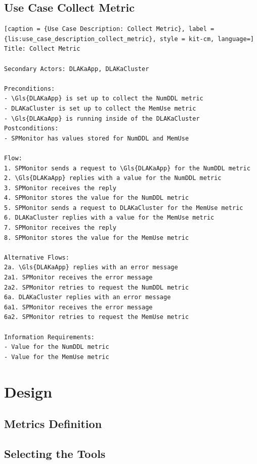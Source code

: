 \subsection{Use Case Collect Metric}

\begin{lstlisting}[caption = {Use Case Description: Collect Metric}, label = {lis:use_case_description_collect_metric}, style = kit-cm, language=]
Title: Collect Metric

Secondary Actors: DLAKaApp, DLAKaCluster

Preconditions:
- \Gls{DLAKaApp} is set up to collect the NumDDL metric
- DLAKaCluster is set up to collect the MemUse metric
- \Gls{DLAKaApp} is running inside of the DLAKaCluster
Postconditions:
- SPMonitor has values stored for NumDDL and MemUse

Flow:
1. SPMonitor sends a request to \Gls{DLAKaApp} for the NumDDL metric
2. \Gls{DLAKaApp} replies with a value for the NumDDL metric
3. SPMonitor receives the reply
4. SPMonitor stores the value for the NumDDL metric
5. SPMonitor sends a request to DLAKaCluster for the MemUse metric
6. DLAKaCluster replies with a value for the MemUse metric
7. SPMonitor receives the reply
8. SPMonitor stores the value for the MemUse metric

Alternative Flows:
2a. \Gls{DLAKaApp} replies with an error message
2a1. SPMonitor receives the error message
2a2. SPMonitor retries to request the NumDDL metric
6a. DLAKaCluster replies with an error message
6a1. SPMonitor receives the error message
6a2. SPMonitor retries to request the MemUse metric

Information Requirements:
- Value for the NumDDL metric
- Value for the MemUse metric
\end{lstlisting}


\section{Design}


\subsection{Metrics Definition}

\subsection{Selecting the Tools}

